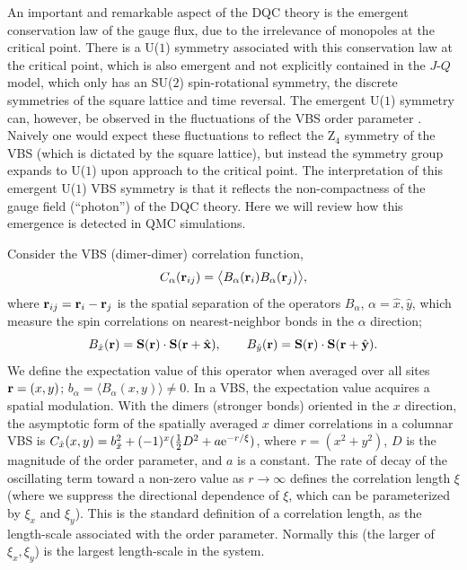 \documentclass[10pt,pre,aps,twocolumn,showpacs,superscriptaddress,floatfix]{revtex4-1}
\begin{document}
An important and remarkable aspect of the DQC theory is the emergent conservation law of the gauge flux, due to the irrelevance of monopoles at the critical point. 
There is a U($1$) symmetry associated with this conservation law at the critical point, which is also emergent and not explicitly contained in 
the $J$-$Q$ model, which only has an SU($2$) spin-rotational symmetry, the discrete symmetries of the square lattice and time reversal. The emergent U($1$) 
symmetry can, however, be observed in the fluctuations of the VBS order parameter \cite{Sandvik07}. Naively one would expect these fluctuations 
to reflect the Z$_4$ symmetry of the VBS (which is dictated by the square lattice), but instead the symmetry group expands to U($1$) upon approach to the 
critical point. The interpretation of this emergent U($1$) VBS symmetry is that it reflects the non-compactness of the gauge field (``photon'') 
of the DQC theory. Here we will review how this emergence is detected in QMC simulations.

Consider the VBS (dimer-dimer) correlation function,
\begin{equation}
C_{\alpha} ({\bf r}_{ij}) = \bigl \langle B_\alpha({\bf r}_i)B_\alpha({\bf r}_j) \bigr \rangle, 
\label{cddef}
\end{equation}
where ${\bf r}_{ij}={\bf r}_{i}-{\bf r}_{j}$ is the spatial separation of the operators $B_\alpha$, $\alpha=\hat x,\hat y$,
which measure the spin correlations on nearest-neighbor bonds in the $\alpha$ direction;
\begin{equation}
B_{\hat x}({\bf r})={\bf S}({\bf r}) \cdot {\bf S}({\bf r}+\hat {\bf x}),~~~~~~B_{\hat y}({\bf r})={\bf S}({\bf r}) \cdot {\bf S}({\bf r}+\hat {\bf y}).
\label{bxdef}
\end{equation}
We define the expectation value of this operator when averaged over all sites ${\bf r}=(x,y)$; $b_\alpha=\langle B_{\alpha}(x,y)\rangle \not = 0$. In a VBS, the 
expectation value acquires a spatial modulation. With the dimers (stronger bonds) oriented in the $x$ direction, the asymptotic form of the spatially averaged 
$x$ dimer correlations in a columnar VBS is $C_{\hat x}(x,y) = b_{\hat x}^2+(-1)^{x}(\hbox{$\frac{1}{2}$}D^2+a{\rm e}^{-r/\xi})$, where $r=(x^2+y^2)$, $D$ is the 
magnitude of the order parameter, and $a$ is a constant. The rate of decay of the oscillating term toward a non-zero value as $r\to \infty$ defines the correlation 
length $\xi$ (where we suppress the directional dependence of $\xi$, which can be parameterized by $\xi_x$ and $\xi_y$). This is the standard definition of a 
correlation length, as the length-scale associated with the order parameter. Normally this (the larger of $\xi_x,\xi_y$) is the largest length-scale in the system. 
\end{document}
